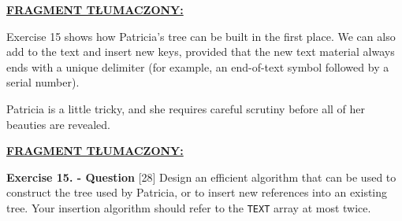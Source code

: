 	\ifsourcematerial
	\begin{displayquote}
		\color{ao(english)}
		\underline{\textbf{FRAGMENT TŁUMACZONY:}} \newline
		
		Exercise 15 shows how Patricia’s tree can be built in the first place. We can
		also add to the text and insert new keys, provided that the new text material
		always ends with a unique delimiter (for example, an end-of-text symbol
		followed by a serial number). \newline
		
		Patricia is a little tricky, and she requires careful scrutiny before all of her
		beauties are revealed.
	\end{displayquote}
	\fi
	
	\ifsourcematerial		
	\begin{displayquote}
		\color{ao(english)}
		\underline{\textbf{FRAGMENT TŁUMACZONY:}} \newline
		
		\textbf{Exercise 15. - Question} 
		[28] Design an efficient algorithm that can be used to construct the tree used by Patricia, or to insert new references into an existing tree. Your insertion algorithm should refer to the \texttt{TEXT} array at most twice.
	\end{displayquote}
	\fi
	
